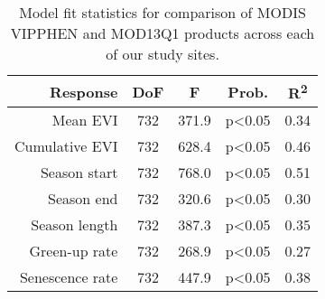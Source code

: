 \begin{table}[h]
\centering
\begin{tabular}{rcccc}
  \hline
Response & DoF & F & Prob. & R\textsuperscript{2} \\ 
  \hline
Mean EVI & 732 & 371.9 & p<0.05 & 0.34 \\ 
  Cumulative EVI & 732 & 628.4 & p<0.05 & 0.46 \\ 
  Season start & 732 & 768.0 & p<0.05 & 0.51 \\ 
  Season end & 732 & 320.6 & p<0.05 & 0.30 \\ 
  Season length & 732 & 387.3 & p<0.05 & 0.35 \\ 
  Green-up rate & 732 & 268.9 & p<0.05 & 0.27 \\ 
  Senescence rate & 732 & 447.9 & p<0.05 & 0.38 \\ 
   \hline
\end{tabular}
\caption{Model fit statistics for comparison of MODIS VIPPHEN and MOD13Q1 products across each of our study sites.} 
\label{annot_df}
\end{table}

